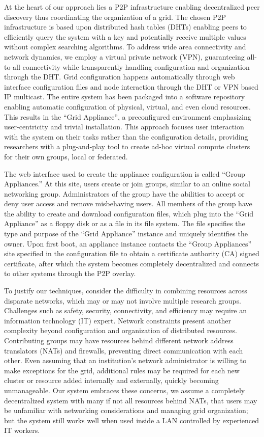 \documentclass[conference]{IEEEtran}
\begin{document}
At the heart of our approach lies a P2P infrastructure enabling decentralized
peer discovery thus coordinating the organization of a grid.  The chosen P2P
infrastructure is based upon distributed hash tables (DHTs) enabling peers to
efficiently query the system with a key and potentially receive multiple values
without complex searching algorithms.  To address wide area connectivity and
network dynamics, we employ a virtual private network (VPN), guaranteeing
all-to-all connectivity while transparently handling configuration and
organization through the DHT.  Grid configuration happens automatically through
web interface configuration files and node interaction through the DHT or VPN
based IP multicast.  The entire system has been packaged into a software
repository enabling automatic configuration of physical, virtual, and even
cloud resources.  This results in the ``Grid Appliance'', a preconfigured
environment emphasizing user-centricity and trivial installation.  This
approach focuses user interaction with the system on their tasks rather than
the configuration details, providing researchers with a plug-and-play tool to
create ad-hoc virtual compute clusters for their own groups, local or
federated.  

The web interface used to create the appliance configuration is called ``Group
Appliances.'' At this site, users create or join groups, similar to an online
social networking group.  Administrators of the group have the abilities to
accept or deny user access and remove misbehaving users.  All members of the
group have the ability to create and download configuration files, which plug
into the ``Grid Appliance'' as a floppy disk or as a file in its file system.
The file specifies the type and purpose of the ``Grid Appliance'' instance and
uniquely identifies the owner.  Upon first boot, an appliance instance contacts
the ``Group Appliances'' site specified in the configuration file to obtain a
certificate authority (CA) signed certificate, after which the system becomes
completely decentralized and connects to other systems through the P2P overlay.  

To justify our techniques, consider the difficulty in combining resources
across disparate networks, which may or may not involve multiple research
groups.  Challenges such as safety, security, connectivity, and efficiency may
require an information technology (IT) expert.  Network constraints present
another complexity beyond configuration and organization of distributed
resources.  Contributing groups may have resources behind different network
address translators (NATs) and firewalls, preventing direct communication with
each other.  Even assuming that an institution's network administrator is
willing to make exceptions for the grid, additional rules may be required for
each new cluster or resource added internally and externally, quickly becoming
unmanageable.  Our system embraces these concerns, we assume a completely
decentralized system with many if not all resources behind NATs, that users may
be unfamiliar with networking considerations and managing grid organization;
but the system still works well when used inside a LAN controlled by
experienced IT workers.
\end{document}
